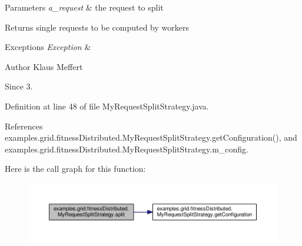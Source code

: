 \begin{DoxyParams}{Parameters}
{\em a\-\_\-request} & the request to split \\
\hline
\end{DoxyParams}
\begin{DoxyReturn}{Returns}
single requests to be computed by workers 
\end{DoxyReturn}

\begin{DoxyExceptions}{Exceptions}
{\em Exception} & \\
\hline
\end{DoxyExceptions}
\begin{DoxyAuthor}{Author}
Klaus Meffert 
\end{DoxyAuthor}
\begin{DoxySince}{Since}
3. 
\end{DoxySince}


Definition at line 48 of file My\-Request\-Split\-Strategy.\-java.



References examples.\-grid.\-fitness\-Distributed.\-My\-Request\-Split\-Strategy.\-get\-Configuration(), and examples.\-grid.\-fitness\-Distributed.\-My\-Request\-Split\-Strategy.\-m\-\_\-config.



Here is the call graph for this function\-:
\nopagebreak
\begin{figure}[H]
\begin{center}
\leavevmode
\includegraphics[width=350pt]{classexamples_1_1grid_1_1fitness_distributed_1_1_my_request_split_strategy_a0e7ae402e3ff4daa1391ec69fea4d6e8_cgraph}
\end{center}
\end{figure}




